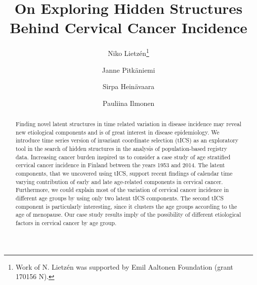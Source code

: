 \documentclass{llncs}
\begin{document}
\title{On Exploring Hidden Structures\\ Behind  Cervical Cancer Incidence}
\author{Niko Lietz\'{e}n\thanks{Work of N. Lietz\'{e}n was supported by Emil Aaltonen Foundation (grant 170156 N).}\and Janne Pitk{\"a}niemi\and Sirpa Hein{\"a}vaara \and  Pauliina Ilmonen}





\maketitle




\begin{abstract}
Finding novel latent structures in time related variation in disease incidence  may reveal new etiological components and is of great interest in disease  epidemiology. We introduce  time series version of invariant coordinate selection (tICS) as an exploratory tool in the search of hidden structures in the analysis of population-based registry data.  Increasing cancer burden inspired us to consider  a case study of age stratified cervical cancer incidence in Finland between the years 1953 and 2014. The latent components, that we uncovered using tICS, support recent findings of calendar time varying contribution of early and late age-related components in cervical cancer. Furthermore, we could explain most of the variation of cervical cancer incidence in different age groups by using only two latent tICS components. The second tICS component is particularly interesting, since it clusters the age groups according to the age of menopause. Our case study results imply of the possibility of different etiological factors in cervical cancer by age group.
\end{abstract}
\end{document}
